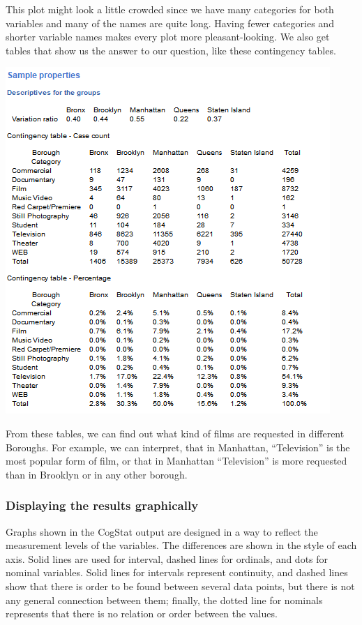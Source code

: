 \documentclass[
]{book}
\begin{document}
This plot might look a little crowded since we have many categories for both variables and many of the names are quite long. Having fewer categories and shorter variable names makes every plot more pleasant-looking. We also get tables that show us the answer to our question, like these contingency tables.

\includegraphics{img/ch1/comparecont.png}

From these tables, we can find out what kind of films are requested in different Boroughs. For example, we can interpret, that in Manhattan, ``Television'' is the most popular form of film, or that in Manhattan ``Television'' is more requested than in Brooklyn or in any other borough.

\hypertarget{displaying-the-results-graphically}{%
\subsubsection{Displaying the results graphically}\label{displaying-the-results-graphically}}

Graphs shown in the CogStat output are designed in a way to reflect the measurement levels of the variables. The differences are shown in the style of each axis. Solid lines are used for interval, dashed lines for ordinals, and dots for nominal variables. Solid lines for intervals represent continuity, and dashed lines show that there is order to be found between several data points, but there is not any general connection between them; finally, the dotted line for nominals represents that there is no relation or order between the values.
\end{document}
